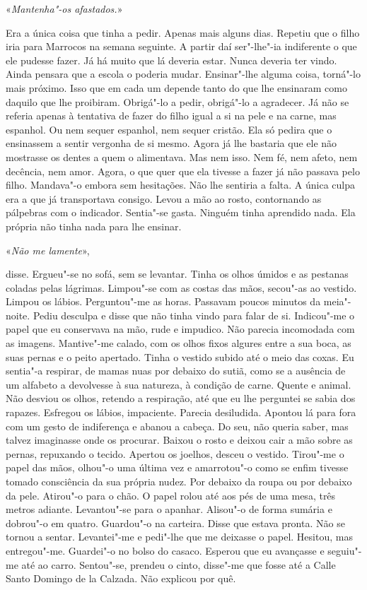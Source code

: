 «\emph{Mantenha"-os afastados.}»

Era a única coisa que tinha a pedir. Apenas mais alguns dias. Repetiu
que o filho iria para Marrocos na semana seguinte. A partir daí
ser"-lhe"-ia indiferente o que ele pudesse fazer. Já há muito que lá
deveria estar. Nunca deveria ter vindo. Ainda pensara que a escola o
poderia mudar. Ensinar"-lhe alguma coisa, torná"-lo mais próximo. Isso
que em cada um depende tanto do que lhe ensinaram como daquilo que lhe
proibiram. Obrigá"-lo a pedir, obrigá"-lo a agradecer. Já não se referia
apenas à tentativa de fazer do filho igual a si na pele e na carne, mas
espanhol. Ou nem sequer espanhol, nem sequer cristão. Ela só pedira que
o ensinassem a sentir vergonha de si mesmo. Agora já lhe bastaria que
ele não mostrasse os dentes a quem o alimentava. Mas nem isso. Nem fé,
nem afeto, nem decência, nem amor. Agora, o que quer que ela tivesse a
fazer já não passava pelo filho. Mandava"-o embora sem hesitações. Não
lhe sentiria a falta. A única culpa era a que já transportava consigo.
Levou a mão ao rosto, contornando as pálpebras com o indicador.
Sentia"-se gasta. Ninguém tinha aprendido nada. Ela própria não tinha
nada para lhe ensinar.

«\emph{Não me lamente}»,

disse. Ergueu"-se no sofá, sem se levantar. Tinha os olhos úmidos e as
pestanas coladas pelas lágrimas. Limpou"-se com as costas das mãos,
secou"-as ao vestido. Limpou os lábios. Perguntou"-me as horas. Passavam
poucos minutos da meia"-noite. Pediu desculpa e disse que não tinha
vindo para falar de si. Indicou"-me o papel que eu conservava na mão,
rude e impudico. Não parecia incomodada com as imagens. Mantive"-me
calado, com os olhos fixos algures entre a sua boca, as suas pernas e o
peito apertado. Tinha o vestido subido até o meio das coxas. Eu
sentia"-a respirar, de mamas nuas por debaixo do sutiã, como se a
ausência de um alfabeto a devolvesse à sua natureza, à condição de
carne. Quente e animal. Não desviou os olhos, retendo a respiração, até
que eu lhe perguntei se sabia dos rapazes. Esfregou os lábios,
impaciente. Parecia desiludida. Apontou lá para fora com um gesto de
indiferença e abanou a cabeça. Do seu, não queria saber, mas talvez
imaginasse onde os procurar. Baixou o rosto e deixou cair a mão sobre as
pernas, repuxando o tecido. Apertou os joelhos, desceu o vestido.
Tirou"-me o papel das mãos, olhou"-o uma última vez e amarrotou"-o como
se enfim tivesse tomado consciência da sua própria nudez. Por debaixo da
roupa ou por debaixo da pele. Atirou"-o para o chão. O papel rolou até
aos pés de uma mesa, três metros adiante. Levantou"-se para o apanhar.
Alisou"-o de forma sumária e dobrou"-o em quatro. Guardou"-o na
carteira. Disse que estava pronta. Não se tornou a sentar. Levantei"-me
e pedi"-lhe que me deixasse o papel. Hesitou, mas entregou"-me.
Guardei"-o no bolso do casaco. Esperou que eu avançasse e seguiu"-me até
ao carro. Sentou"-se, prendeu o cinto, disse"-me que fosse até a Calle
Santo Domingo de la Calzada. Não explicou por quê.

